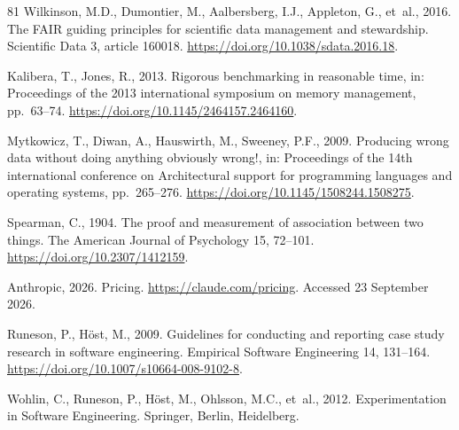 \documentclass[final,5p,times,twocolumn,number]{elsarticle}
\begin{document}
\begin{thebibliography}{81}
Wilkinson, M.D., Dumontier, M., Aalbersberg, I.J., Appleton, G., et~al., 2016. The FAIR guiding principles for scientific data management and stewardship. Scientific Data 3, article 160018. \url{https://doi.org/10.1038/sdata.2016.18}.

Kalibera, T., Jones, R., 2013. Rigorous benchmarking in reasonable time, in: Proceedings of the 2013 international symposium on memory management, pp.~63--74. \url{https://doi.org/10.1145/2464157.2464160}.

Mytkowicz, T., Diwan, A., Hauswirth, M., Sweeney, P.F., 2009. Producing wrong data without doing anything obviously wrong!, in: Proceedings of the 14th international conference on Architectural support for programming languages and operating systems, pp.~265--276. \url{https://doi.org/10.1145/1508244.1508275}.

Spearman, C., 1904. The proof and measurement of association between two things. The American Journal of Psychology 15, 72--101. \url{https://doi.org/10.2307/1412159}.

Anthropic, 2026. Pricing. \url{https://claude.com/pricing}. Accessed 23 September
2026.

Runeson, P., H\"{o}st, M., 2009. Guidelines for conducting and reporting case study research in software engineering. Empirical Software Engineering 14, 131--164. \url{https://doi.org/10.1007/s10664-008-9102-8}.

Wohlin, C., Runeson, P., H\"{o}st, M., Ohlsson, M.C., et~al., 2012. Experimentation in Software Engineering. Springer, Berlin, Heidelberg.
\end{thebibliography}
\end{document}
